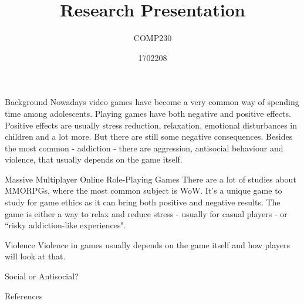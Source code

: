 \documentclass{beamer}
\title{Research Presentation}
\subtitle{COMP230}
\author{1702208}
\begin{document}
\begin{frame}
	\maketitle
\end{frame}

\begin{frame}{Background}
	Nowadays video games have become a very common way of spending time among adolescents. Playing games have both negative and positive effects. Positive effects are usually stress reduction\cite{russoniello2009effectiveness}, relaxation\cite{wack2009relationships}, emotional disturbances in children\cite{jones2014gaming}\cite{hull2009computer} and a lot more. But there are still some negative consequences. Besides the most common - addiction - there are aggression, antisocial behaviour and violence, that usually depends on the game itself.
\end{frame}

\begin{frame}{Massive Multiplayer Online Role-Playing Games}
	There are a lot of studies about MMORPGs, where the most common subject is WoW. It's a unique game to study for game ethics as it can bring both positive and negative results. The game is either a way to relax and reduce stress - usually for casual players - or ``risky addiction-like experiences"\cite{snodgrass2011magical}. 
\end{frame}

\begin{frame}{Violence}
	Violence in games usually depends on the game itself and how players will look at that. 
\end{frame}

\begin{frame}{Social or Antisocial?}
	
\end{frame}
\begin{frame}{References}
	
	
\end{frame}
\end{document}
